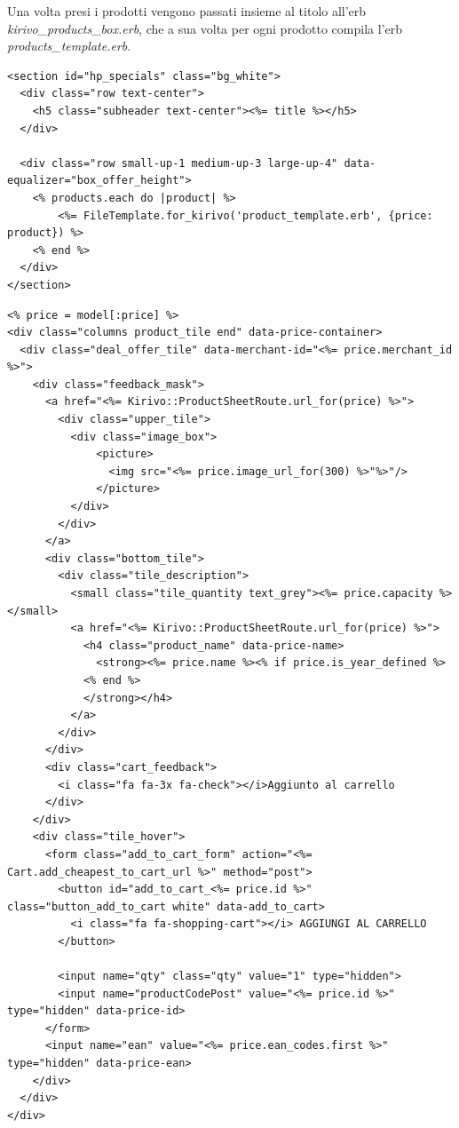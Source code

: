 Una volta presi i prodotti vengono passati insieme al titolo all'erb \emph{kirivo\_products\_box.erb}, che a sua volta per ogni prodotto
compila l'erb \emph{products\_template.erb}.
\newpage
\begin{lstlisting}[basicstyle=\tiny,caption={Il template \emph{kirivo\_products\_box.erb}}] 
<section id="hp_specials" class="bg_white">
  <div class="row text-center">
    <h5 class="subheader text-center"><%= title %></h5>
  </div>

  <div class="row small-up-1 medium-up-3 large-up-4" data-equalizer="box_offer_height">
    <% products.each do |product| %>
        <%= FileTemplate.for_kirivo('product_template.erb', {price: product}) %>
    <% end %>
  </div>
</section>
\end{lstlisting}
\begin{lstlisting}[basicstyle=\tiny, caption={Il template \emph{products\_template.erb}}] 
<% price = model[:price] %>
<div class="columns product_tile end" data-price-container>
  <div class="deal_offer_tile" data-merchant-id="<%= price.merchant_id %>">
    <div class="feedback_mask">
      <a href="<%= Kirivo::ProductSheetRoute.url_for(price) %>">
        <div class="upper_tile">
          <div class="image_box">
              <picture>
                <img src="<%= price.image_url_for(300) %>"%>"/>
              </picture>
          </div>
        </div>
      </a>
      <div class="bottom_tile">
        <div class="tile_description">
          <small class="tile_quantity text_grey"><%= price.capacity %></small>
          <a href="<%= Kirivo::ProductSheetRoute.url_for(price) %>">
            <h4 class="product_name" data-price-name>
              <strong><%= price.name %><% if price.is_year_defined %>
            <% end %>
            </strong></h4>
          </a>
        </div>
      </div>
      <div class="cart_feedback">
        <i class="fa fa-3x fa-check"></i>Aggiunto al carrello
      </div>
    </div>
    <div class="tile_hover">
      <form class="add_to_cart_form" action="<%= Cart.add_cheapest_to_cart_url %>" method="post">
        <button id="add_to_cart_<%= price.id %>" class="button_add_to_cart white" data-add_to_cart>
          <i class="fa fa-shopping-cart"></i> AGGIUNGI AL CARRELLO
        </button>

        <input name="qty" class="qty" value="1" type="hidden">
        <input name="productCodePost" value="<%= price.id %>" type="hidden" data-price-id>
      </form>
      <input name="ean" value="<%= price.ean_codes.first %>" type="hidden" data-price-ean>
    </div>
  </div>
</div>
\end{lstlisting}


